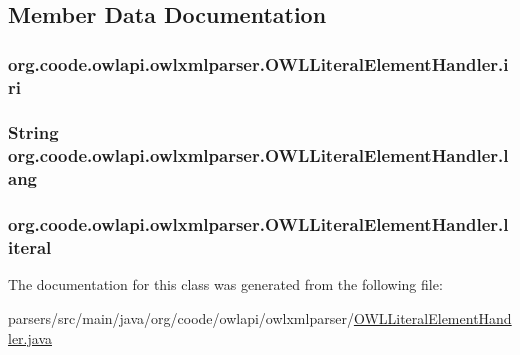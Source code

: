 \subsection{Member Data Documentation}
\hypertarget{classorg_1_1coode_1_1owlapi_1_1owlxmlparser_1_1_o_w_l_literal_element_handler_a1ace6ab701504e337c9049729566f2f8}{
\subsubsection[{iri}]{ org.\-coode.\-owlapi.\-owlxmlparser.\-O\-W\-L\-Literal\-Element\-Handler.\-iri\hspace{0.3cm}{\ttfamily [private]}}}\label{classorg_1_1coode_1_1owlapi_1_1owlxmlparser_1_1_o_w_l_literal_element_handler_a1ace6ab701504e337c9049729566f2f8}
\hypertarget{classorg_1_1coode_1_1owlapi_1_1owlxmlparser_1_1_o_w_l_literal_element_handler_a1690f81e2bb69933070e14922558d0e0}{
\subsubsection[{lang}]{\setlength{\rightskip}{0pt plus 5cm}String org.\-coode.\-owlapi.\-owlxmlparser.\-O\-W\-L\-Literal\-Element\-Handler.\-lang\hspace{0.3cm}{\ttfamily [private]}}}\label{classorg_1_1coode_1_1owlapi_1_1owlxmlparser_1_1_o_w_l_literal_element_handler_a1690f81e2bb69933070e14922558d0e0}
\hypertarget{classorg_1_1coode_1_1owlapi_1_1owlxmlparser_1_1_o_w_l_literal_element_handler_a75bf8a28366e18645c529cd84600b33e}{
\subsubsection[{literal}]{ org.\-coode.\-owlapi.\-owlxmlparser.\-O\-W\-L\-Literal\-Element\-Handler.\-literal\hspace{0.3cm}{\ttfamily [private]}}}\label{classorg_1_1coode_1_1owlapi_1_1owlxmlparser_1_1_o_w_l_literal_element_handler_a75bf8a28366e18645c529cd84600b33e}


The documentation for this class was generated from the following file\-:\begin{DoxyCompactItemize}
\item 
parsers/src/main/java/org/coode/owlapi/owlxmlparser/\hyperlink{_o_w_l_literal_element_handler_8java}{O\-W\-L\-Literal\-Element\-Handler.\-java}\end{DoxyCompactItemize}
